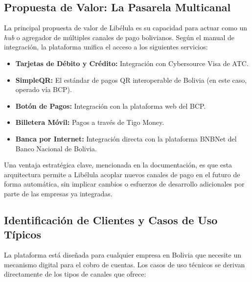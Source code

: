     \subsection{Propuesta de Valor: La Pasarela Multicanal}
        La principal propuesta de valor de Libélula es su capacidad para actuar como un \emph{hub} o agregador de múltiples canales 
        de pago bolivianos. Según el manual de integración, la plataforma unifica el acceso a los siguientes servicios:\par

            \begin{itemize}
                \item \textbf{Tarjetas de Débito y Crédito:} Integración con Cybersource Visa de ATC.
                \item \textbf{SimpleQR:} El estándar de pagos QR interoperable de Bolivia (en este caso, operado vía BCP).
                \item \textbf{Botón de Pagos:} Integración con la plataforma web del BCP.
                \item \textbf{Billetera Móvil:} Pagos a través de Tigo Money.
                \item \textbf{Banca por Internet:} Integración directa con la plataforma BNBNet del Banco Nacional de Bolivia.
            \end{itemize}

        Una ventaja estratégica clave, mencionada en la documentación, es que esta arquitectura permite a Libélula acoplar nuevos canales 
        de pago en el futuro de forma automática, sin implicar cambios o esfuerzos de desarrollo adicionales por parte de las empresas 
        ya integradas.\par

    \subsection{Identificación de Clientes y Casos de Uso Típicos}
        La plataforma está diseñada para cualquier empresa en Bolivia que necesite un mecanismo digital para el cobro de cuentas. 
        Los casos de uso técnicos se derivan directamente de los tipos de canales que ofrece:\par

